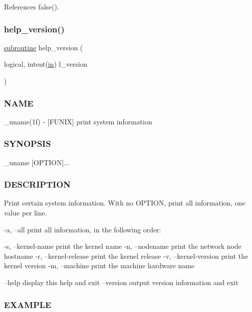 References false().

\mbox{\label{__uname_8f90_a39c21619b08a3c22f19e2306efd7f766}} 
\subsubsection{\texorpdfstring{help\+\_\+version()}{help\_version()}}
{\footnotesize\ttfamily \hyperlink{M__stopwatch_83_8txt_acfbcff50169d691ff02d4a123ed70482}{subroutine} help\+\_\+version (\begin{DoxyParamCaption}\item[{logical, intent(\hyperlink{M__journal_83_8txt_afce72651d1eed785a2132bee863b2f38}{in})}]{l\+\_\+version }\end{DoxyParamCaption})}



\subsubsection*{N\+A\+ME}

\+\_\+uname(1f) -\/ \mbox{[}F\+U\+N\+IX\mbox{]} print system information 

\subsubsection*{S\+Y\+N\+O\+P\+S\+IS}

\begin{DoxyVerb}    _uname [OPTION]...
\end{DoxyVerb}


\subsubsection*{D\+E\+S\+C\+R\+I\+P\+T\+I\+ON}

Print certain system information. With no O\+P\+T\+I\+ON, print all information, one value per line.

-\/a, --all print all information, in the following order\+:

-\/s, --kernel-\/name print the kernel name -\/n, --nodename print the network node hostname -\/r, --kernel-\/release print the kernel release -\/v, --kernel-\/version print the kernel version -\/m, --machine print the machine hardware name

--help display this help and exit --version output version information and exit \subsubsection*{E\+X\+A\+M\+P\+LE}

